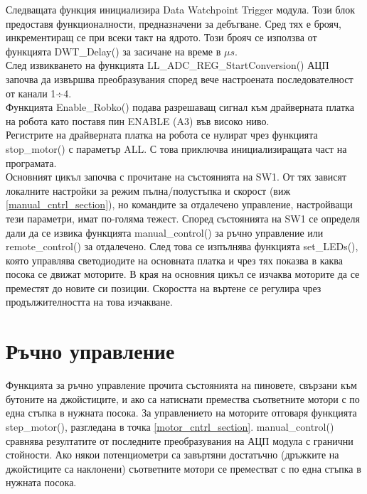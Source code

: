 \indent{}
Следващата функция инициализира Data Watchpoint Trigger модула. Този блок предоставя функционалности, предназначени за дебъгване. Сред тях е брояч, инкрементиращ се при всеки такт на ядрото.
\cite{arm_arch}
Този брояч се използва от функцията DWT\_Delay() за засичане на време в $\mu s$.\\
\indent{}
След извикването на функцията LL\_ADC\_REG\_StartConversion() АЦП започва да извършва преобразувания според вече настроената последователност от канали 1÷4.\\
\indent{}
Функцията Enable\_Robko() подава разрешаващ сигнал към драйверната платка на робота като поставя пин ENABLE (A3) във високо ниво.\\
\indent{}
Регистрите на драйверната платка на робота се нулират чрез функцията stop\_motor() с параметър ALL. С това приключва инициализиращата част на програмата.\\
\indent{}
Основният цикъл започва с прочитане на състоянията на SW1. От тях зависят локалните настройки за режим пълна/полустъпка и скорост (виж \ref{manual_cntrl_section}), но командите за отдалечено управление, настройващи тези параметри, имат по-голяма тежест. Според състоянията на SW1 се определя дали да се извика функцията manual\_control() за ръчно управление или remote\_control() за отдалечено. След това се изпълнява функцията set\_LEDs(), която управлява светодиодите на основната платка и чрез тях показва в каква посока се движат моторите. В края на основния цикъл се изчаква моторите да се преместят до новите си позиции. Скоростта на въртене се регулира чрез продължителността на това изчакване.
\section{Ръчно управление}
Функцията за ръчно управление прочита състоянията на пиновете, свързани към бутоните на джойстиците, и ако са натиснати премества съответните мотори с по една стъпка в нужната посока. За управлението на моторите отговаря функцията step\_motor(), разгледана в точка \ref{motor_cntrl_section}. manual\_control() сравнява резултатите от последните преобразувания на АЦП модула с гранични стойности. Ако някои потенциометри са завъртяни достатъчно (дръжките на джойстиците са наклонени) съответните мотори се преместват с по една стъпка в нужната посока.
